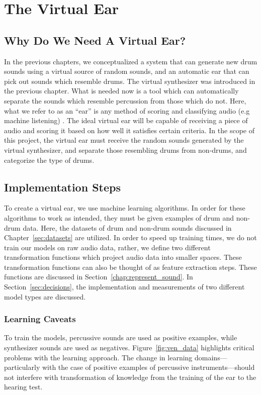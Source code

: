 \documentclass[\main/thesis.tex]{subfiles}
\begin{document}
\chapter{The Virtual Ear}
\section{Why Do We Need A Virtual Ear?}
\label{sec:ear}
In the previous chapters, we conceptualized a system that can generate new drum sounds using a virtual source of random sounds, and an automatic ear that can pick out sounds which resemble drums. The virtual synthesizer was introduced in the previous chapter. What is needed now is a tool which can automatically separate the sounds which resemble percussion from those which do not. Here, what we refer to as an \enquote{ear} is any method of scoring and classifying audio (e.g machine listening) \cite{malkin2006machine,rowe1992interactive}. The ideal virtual ear will be capable of receiving a piece of audio and scoring it based on how well it satisfies certain criteria. In the scope of this project, the virtual ear must receive the random sounds generated by the virtual synthesizer, and separate those resembling drums from non-drums, and categorize the type of drums. 
 
\section{Implementation Steps}
To create a virtual ear, we use machine learning algorithms. In order for these algorithms to work as intended, they must be given examples of drum and non-drum data. Here, the datasets of drum and non-drum sounds discussed in Chapter~\ref{sec:datasets} are utilized. In order to speed up training times, we do not train our models on raw audio data, rather, we define two different transformation functions which project audio data into smaller spaces. These transformation functions can also be thought of as feature extraction steps. These functions are discussed in Section~\ref{chap:represent_sound}. In Section~\ref{sec:decisions}, the implementation and measurements of two different model types are discussed.

\subsection{Learning Caveats}
To train the models, percussive sounds are used as positive examples, while synthesizer sounds are used as negatives. Figure~\ref{fig:ven_data} highlights critical problems with the learning approach. The change in learning domains---particularly with the case of positive examples of percussive instruments---should not interfere with transformation of knowledge from the training of the ear to the hearing test. 
\end{document}
